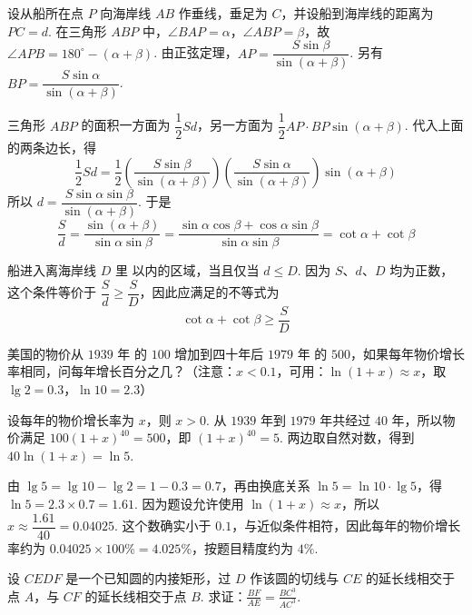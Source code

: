 \begin{solution}
设从船所在点 \(P\) 向海岸线 \(AB\) 作垂线，垂足为 \(C\)，并设船到海岸线的距离为 \(PC=d\). 在三角形 \(ABP\) 中，\(\angle BAP=\alpha\)，\(\angle ABP=\beta\)，故 \(\angle APB=180^\circ-(\alpha+\beta)\). 由正弦定理，\(AP=\dfrac{S\sin\beta}{\sin(\alpha+\beta)}\). 另有 \(BP=\dfrac{S\sin\alpha}{\sin(\alpha+\beta)}\).

三角形 \(ABP\) 的面积一方面为 \(\dfrac{1}{2}Sd\)，另一方面为 \(\dfrac{1}{2}AP\cdot BP\sin(\alpha+\beta)\). 代入上面的两条边长，得
\[
\frac{1}{2}Sd=\frac{1}{2}\left(\frac{S\sin\beta}{\sin(\alpha+\beta)}\right)\left(\frac{S\sin\alpha}{\sin(\alpha+\beta)}\right)\sin(\alpha+\beta)
\]
所以 \(d=\dfrac{S\sin\alpha\sin\beta}{\sin(\alpha+\beta)}\). 于是
\[
\frac{S}{d}=\frac{\sin(\alpha+\beta)}{\sin\alpha\sin\beta}=\frac{\sin\alpha\cos\beta+\cos\alpha\sin\beta}{\sin\alpha\sin\beta}=\cot\alpha+\cot\beta
\]

船进入离海岸线 \(D\text{ 里}\) 以内的区域，当且仅当 \(d\leqslant D\). 因为 \(S\)、\(d\)、\(D\) 均为正数，这个条件等价于 \(\dfrac{S}{d}\geqslant\dfrac{S}{D}\)，因此应满足的不等式为
\[
\boxed{\cot\alpha+\cot\beta\geqslant\frac{S}{D}}
\]
\end{solution}

\begin{problem}
美国的物价从 \(1939\text{ 年}\) 的 \(100\) 增加到四十年后 \(1979\text{ 年}\) 的 \(500\)，如果每年物价增长率相同，问每年增长百分之几？（注意：\(x<0.1\)，可用：\(\ln(1 + x)\approx x\)，取 \(\lg 2 = 0.3\)，\(\ln 10 = 2.3\)）
\end{problem}

\begin{solution}
设每年的物价增长率为 \(x\)，则 \(x>0\). 从 \(1939\) 年到 \(1979\) 年共经过 \(40\) 年，所以物价满足 \(100(1+x)^{40}=500\)，即 \((1+x)^{40}=5\). 两边取自然对数，得到 \(40\ln(1+x)=\ln5\).

由 \(\lg 5=\lg10-\lg2=1-0.3=0.7\)，再由换底关系 \(\ln5=\ln10\cdot\lg5\)，得 \(\ln5=2.3\times0.7=1.61\). 因为题设允许使用 \(\ln(1+x)\approx x\)，所以 \(x\approx\dfrac{1.61}{40}=0.04025\). 这个数确实小于 \(0.1\)，与近似条件相符，因此每年的物价增长率约为 \(0.04025\times100\%=4.025\%\)，按题目精度约为 \(4\%\).
\end{solution}

\begin{problem}
设 \(CEDF\) 是一个已知圆的内接矩形，过 \(D\) 作该圆的切线与 \(CE\) 的延长线相交于点 \(A\)，与 \(CF\) 的延长线相交于点 \(B\). 求证：\(\frac{BF}{AE} = \frac{BC^{3}}{AC^{3}}\).

\end{problem}

